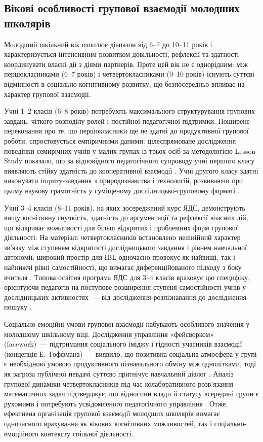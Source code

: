 \documentclass[a4paper,14pt]{extarticle}
\begin{document}
\subsection{Вікові особливості групової взаємодії молодших школярів}

Молодший шкільний вік охоплює діапазон від 6--7 до 10--11 років і характеризується інтенсивним розвитком довільності, рефлексії та здатності координувати власні дії з діями партнерів. Проте цей вік не є однорідним: між першокласниками (6--7 років) і четвертокласниками (9--10 років) існують суттєві відмінності в соціально-когнітивному розвитку, що безпосередньо впливає на характер групової взаємодії.

Учні 1--2 класів (6--8 років) потребують максимального структурування групових завдань, чіткого розподілу ролей і постійної педагогічної підтримки. Поширене переконання про те, що першокласники ще не здатні до продуктивної групової роботи, спростовується емпіричними даними: цілеспрямоване дослідження поведінки семирічних учнів у малих групах із трьох осіб за методологією Lesson Study показало, що за відповідного педагогічного супроводу учні першого класу виявляють стійку здатність до кооперативної взаємодії \parencite{Jakavonytė-Staškuvienė2025}. Учні другого класу здатні виконувати inquiry-завдання з природознавства і технологій, розвиваючи при цьому наукову грамотність у суміщеному дослідницько-груповому форматі \parencite{Zuñiga-Quispe2025365}.

Учні 3--4 класів (8--11 років), на яких зосереджений курс ЯДС, демонструють вищу когнітивну гнучкість, здатність до аргументації та рефлексії власних дій, що відкриває можливості для більш відкритих і проблемних форм групової діяльності. На матеріалі четвертокласників встановлено нелінійний характер зв'язку між ступенем відкритості дослідницького завдання і рівнем навчальної автономії: широкий простір для IBL одночасно провокує як найвищі, так і найнижчі рівні самостійності, що вимагає диференційованого підходу з боку вчителя \parencite{Aminga2026}. Типова освітня програма ЯДС для 3--4 класів враховує цю специфіку, орієнтуючи педагогів на поступове розширення ступеня самостійності учнів у дослідницьких активностях~--- від дослідження-розпізнавання до дослідження-пошуку \parencite{Savchenko2019}.

Соціально-емоційні умови групової взаємодії набувають особливого значення у молодшому шкільному віці. Дослідження управління «фейсворком» (facework)~--- підтримання соціального іміджу і гідності учасників взаємодії (концепція Е.~Гоффмана)~--- виявило, що позитивна соціальна атмосфера у групі є необхідною умовою продуктивного пізнавального обміну між однолітками, тоді як загроза публічної невдачі суттєво пригнічує навчальний діалог \parencite{Evnitskaya2021169}. Аналіз групової динаміки четвертокласників під час колаборативного розв'язання математичних задач підтверджує, що відносини влади й статусу всередині групи є рухомими і потребують усвідомленого педагогічного управління \parencite{Langer-Osuna2020514}. Отже, ефективна організація групової взаємодії молодших школярів вимагає одночасного врахування як вікових когнітивних можливостей, так і соціально-емоційного контексту спільної діяльності.
\end{document}
